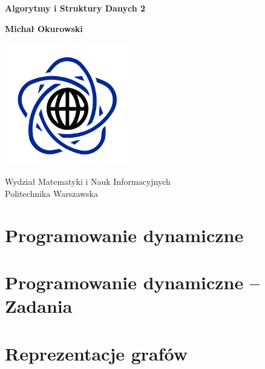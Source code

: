 



\begin{titlepage}
    \begin{center}
        \vspace*{1cm}

        \Huge

        \textbf{Algorytmy i Struktury Danych 2}

        \vspace{1.5cm}

        \LARGE

        \textbf{Michał Okurowski}

        \vfill  

        \vspace{0.8cm}

        \includegraphics[width=0.4\textwidth]{data/university.png}

        Wydział Matematyki i Nauk Informacyjnych\\
        Politechnika Warszawska\\
    \end{center}
\end{titlepage}

\tableofcontents
\pagebreak

\section{Programowanie dynamiczne}

\section{Programowanie dynamiczne -- Zadania}

\section{Reprezentacje grafów}

